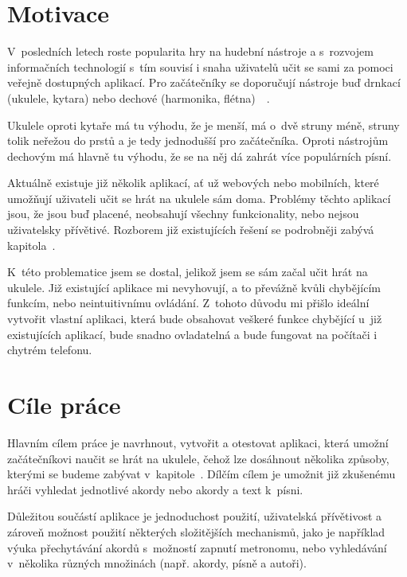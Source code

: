 \begin{introduction}
    \label{ch:introduction}
    \section{Motivace}
    V~posledních letech roste popularita hry na hudební nástroje a s~rozvojem informačních technologií s~tím souvisí i snaha uživatelů učit se sami za pomoci veřejně dostupných aplikací. Pro začátečníky se doporučují nástroje buď drnkací (ukulele, kytara) nebo dechové (harmonika, flétna)~\cite{s_2016_the}~\cite{richardson_2019_top}.

    Ukulele oproti kytaře má tu výhodu, že je menší, má o~dvě struny méně, struny tolik neřežou do prstů a je tedy jednodušší pro začátečníka. Oproti nástrojům dechovým má hlavně tu výhodu, že se na něj dá zahrát více populárních písní.

    Aktuálně existuje již několik aplikací, ať už webových nebo mobilních, které umožňují uživateli učit se hrát na ukulele sám doma. Problémy těchto aplikací jsou, že jsou buď placené, neobsahují všechny funkcionality, nebo nejsou uživatelsky přívětivé. Rozborem již existujících řešení se podrobněji zabývá kapitola~.

    K~této problematice jsem se dostal, jelikož jsem se sám začal učit hrát na ukulele. Již existující aplikace mi nevyhovují, a to převážně kvůli chybějícím funkcím, nebo neintuitivnímu ovládání. Z~tohoto důvodu mi přišlo ideální vytvořit vlastní aplikaci, která bude obsahovat veškeré funkce chybějící u~již existujících aplikací, bude snadno ovladatelná a bude fungovat na počítači i chytrém telefonu.


    \section{Cíle práce}
    Hlavním cílem práce je navrhnout, vytvořit a otestovat aplikaci, která umožní začátečníkovi naučit se hrát na ukulele, čehož lze dosáhnout několika způsoby, kterými se budeme zabývat v~kapitole~. Dílčím cílem je umožnit již zkušenému hráči vyhledat jednotlivé akordy nebo akordy a text k~písni.

    Důležitou součástí aplikace je jednoduchost použití, uživatelská přívětivost a zároveň možnost použití některých složitějších mechanismů, jako je například výuka přechytávání akordů s~možností zapnutí metronomu, nebo vyhledávání v~několika různých množinách (např. akordy, písně a autoři).


\end{introduction}
